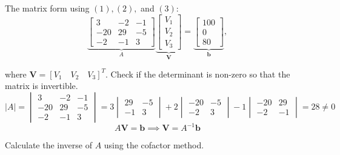 \documentclass[11pt]{article}
\begin{document}
\begin{enumerate}[leftmargin=*,label=\textbf{\arabic*.}]
The matrix form using $(1), (2),$ and $(3)$:
\[
\underbrace{\begin{bmatrix}
3 & -2 & -1 \\
-20 & 29 & -5 \\
-2 & -1 & 3
\end{bmatrix}}_A
\underbrace{\begin{bmatrix}
V_1 \\
V_2 \\
V_3
\end{bmatrix}}_\mathbf{V}
=
\underbrace{\begin{bmatrix}
100 \\
0 \\
80
\end{bmatrix}}_\mathbf{b},
\]

where $\mathbf{V}=[V_1\quad V_2\quad V_3]^T$. Check if the determinant is non-zero so that the matrix is invertible.
\[|A| =
\begin{vmatrix}
3 & -2 & -1 \\
-20 & 29 & -5 \\
-2 & -1 & 3
\end{vmatrix}
=
3
\begin{vmatrix}
29 & -5 \\
-1 & 3
\end{vmatrix}
+ 2
\begin{vmatrix}
-20 & -5 \\
-2 & 3
\end{vmatrix}
- 1
\begin{vmatrix}
-20 & 29 \\
-2 & -1
\end{vmatrix}=28\neq0
\]
\[A\mathbf{V}=\mathbf{b}\implies\mathbf{V}=A^{-1}\mathbf{b}\]

Calculate the inverse of $A$ using the cofactor method.


\end{enumerate}
\end{document}
